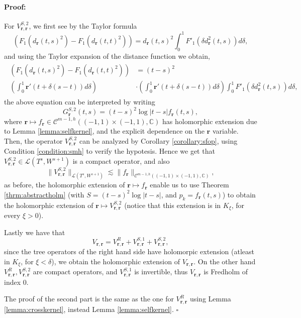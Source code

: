 \documentclass{article}
\newenvironment{proof}{\paragraph{Proof:}}{\hfill$\square$}
\newcommand{\IC}{{\mathbb C}}
\newcommand{\cmspaceh}[4]{\mathcal{C}^{#1,#2} \left( #3, #4 \right)}
\newcommand{\br}{\bm{r}}
\newcommand{\iinterv}{(-1,1)\times(-1,1)}
\begin{document}
\begin{proof}
For $V^{S,2}_{\br,\br}$, we first see by the Taylor formula
$$
(F_1(d_{\br}(t,s)^2)-F_1(d_{\br}(t,t)^2)) = d_{\br}(t,s)^2\int_{0}^1 F'_1(\delta d^2_{\br}(t,s))d\delta,
$$
and using the Taylor expansion of the distance function we obtain,
\begin{align*}
\begin{split}
(F_1(d_{\br}(t,s)^2)-F_1(d_{\br}(t,t)^2)) &= (t-s)^2 \\ \left(\int_{0}^1 \br'(t+\delta(s-t))d\delta \right) &\cdot \left(\int_{0}^1 \br'(t+\delta(s-t))d\delta \right)\int_{0}^1 F'_1(\delta d^2_{\br}(t,s))d\delta,
\end{split}
\end{align*}
the above equation can be interpreted  by writing 
$$G_{\br}^{S,2}(t,s) = (t-s)^2 \log|t-s| f_{\br}(t,s),$$
where $\br \mapsto f_{\br} \in \cmspaceh{m-1}{h}{\iinterv}{\IC}$ has holomorphic extension due to Lemma \ref{lemma:selfkernel}, and the explicit dependence on the $\br$  variable. Then, the operator $V_{\br,\br}^{S,2}$ can be analyzed by Corollary \ref{corollary:sfop}, using Condition \ref{condition:smh} to verify the hypotesis. Hence we get that $V_{\br,\br}^{S,2} \in \mathcal{L}
\left(T^s,W^{s+1}\right) $ is a compact operator, and also 
$$
\|V_{\br,\br}^{S,2}\|_{\mathcal{L}
\left(T^s,W^{s+1}\right)} \lesssim \|f_{\br}\|_{\cmspaceh{m-1}{h}{\iinterv}{\IC}},
$$
as before, the holomorphic extension of $\br \mapsto f_{\br}$ enable us to use Theorem \ref{thrm:abstractholm} (with  $S=(t-s)^2\log |t-s|$, and $p_k = f_{\br}(t,s)$) to obtain the holomorphic extension of $\br \mapsto V_{\br,\br}^{S,2}$ (notice that this extension is in $K_\xi$, for every $\xi >0$).

Lastly we have that 
$$
V_{\br,\br} =V_{\br,\br}^{R}+V_{\br,\br}^{S,1} + V_{\br,\br}^{S,2},
$$
since the tree operators of the right hand side have holomorpic extension (atleast in $K_\xi$, for $\xi < \delta$), we obtain the holomorphic extension of $V_{\br,\br}$. On the other hand $V_{\br,\br}^{R}, V_{\br,\br}^{S,2}$ are compact operators, and $V_{\br,\br}^{S,1}$ is invertible, thus 
$V_{\br,\br}$ is Fredholm of index 0.

The proof of the second part is the same as the one for $V^R_{\br,\br}$ using Lemma \ref{lemma:crosskernel}, instead Lemma \ref{lemma:selfkernel}.
\end{proof}
\end{document}

